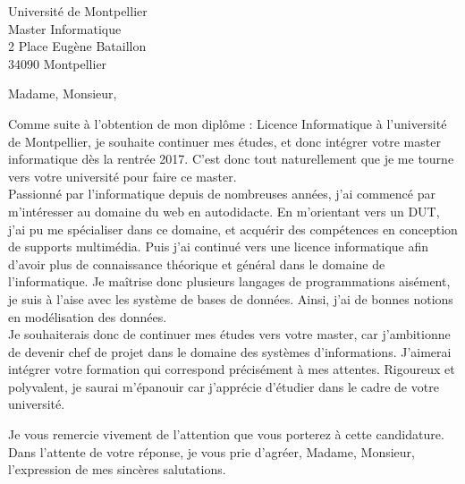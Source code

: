 \documentclass[12pt]{lettre}
\begin{document}
    \begin{letter}{Université de Montpellier\\
        Master Informatique\\
        2 Place Eugène Bataillon\\
        34090 Montpellier}

        \nodate
        \nolieu
        \nofax
        
        \address{24 Impasse de Sumer\\
            34070 Montpellier}

        \opening{Madame, Monsieur, }

        Comme suite à l'obtention de mon diplôme : Licence Informatique à l'université de Montpellier, je souhaite continuer mes études, et donc intégrer votre master informatique dès la rentrée 2017. C'est donc tout naturellement que je me tourne vers votre université pour faire ce master.\\

        Passionné par l'informatique depuis de nombreuses années, j'ai commencé par m'intéresser au domaine du web en autodidacte. En m'orientant vers un DUT, j'ai pu me spécialiser dans ce domaine, et acquérir des compétences en conception de supports multimédia. Puis j'ai continué vers une licence informatique afin d'avoir plus de connaissance théorique et général dans le domaine de l'informatique. Je maîtrise donc plusieurs langages de programmations aisément, je suis à l'aise avec les système de bases de données. Ainsi, j'ai de bonnes notions en modélisation des données.\\

        Je souhaiterais donc de continuer mes études vers votre master, car j'ambitionne de devenir chef de projet dans le domaine des systèmes d'informations. J'aimerai intégrer votre formation qui correspond précisément à mes attentes. Rigoureux et polyvalent, je saurai m’épanouir car j'apprécie d'étudier
        dans le cadre de votre université.\\

        \closing{Je vous remercie vivement de l’attention que vous porterez à cette candidature. Dans l’attente de votre réponse, je vous prie d’agréer, Madame, Monsieur, l’expression de mes sincères salutations.}
    \end{letter}
\end{document}
